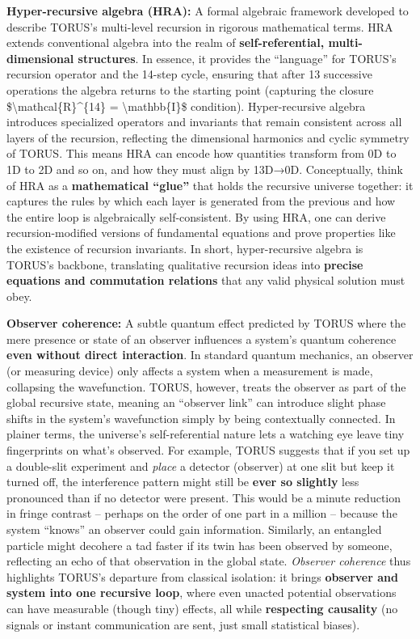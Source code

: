 \textbf{Hyper-recursive algebra (HRA):} A formal algebraic framework
developed to describe TORUS's multi-level recursion in rigorous
mathematical terms. HRA extends conventional algebra into the realm of
\textbf{self-referential, multi-dimensional structures}​. In essence, it
provides the ``language'' for TORUS's recursion operator and the 14-step
cycle, ensuring that after 13 successive operations the algebra returns
to the starting point (capturing the closure
\$\textbackslash{}mathcal\{R\}\^{}\{14\} = \textbackslash{}mathbb\{I\}\$
condition)​. Hyper-recursive algebra introduces specialized operators
and invariants that remain consistent across all layers of the
recursion, reflecting the dimensional harmonics and cyclic symmetry of
TORUS​. This means HRA can encode how quantities transform from 0D to 1D
to 2D and so on, and how they must align by 13D→0D. Conceptually, think
of HRA as a \textbf{mathematical ``glue''} that holds the recursive
universe together: it captures the rules by which each layer is
generated from the previous and how the entire loop is algebraically
self-consistent. By using HRA, one can derive recursion-modified
versions of fundamental equations and prove properties like the
existence of recursion invariants. In short, hyper-recursive algebra is
TORUS's backbone, translating qualitative recursion ideas into
\textbf{precise equations and commutation relations} that any valid
physical solution must obey.

\textbf{Observer coherence:} A subtle quantum effect predicted by TORUS
where the mere presence or state of an observer influences a system's
quantum coherence \textbf{even without direct interaction}​. In standard
quantum mechanics, an observer (or measuring device) only affects a
system when a measurement is made, collapsing the wavefunction. TORUS,
however, treats the observer as part of the global recursive state,
meaning an ``observer link'' can introduce slight phase shifts in the
system's wavefunction simply by being contextually connected​. In
plainer terms, the universe's self-referential nature lets a watching
eye leave tiny fingerprints on what's observed. For example, TORUS
suggests that if you set up a double-slit experiment and \emph{place} a
detector (observer) at one slit but keep it turned off, the interference
pattern might still be \textbf{ever so slightly} less pronounced than if
no detector were present​. This would be a minute reduction in fringe
contrast -- perhaps on the order of one part in a million -- because the
system ``knows'' an observer could gain information​. Similarly, an
entangled particle might decohere a tad faster if its twin has been
observed by someone, reflecting an echo of that observation in the
global state. \emph{Observer coherence} thus highlights TORUS's
departure from classical isolation: it brings \textbf{observer and
system into one recursive loop}, where even unacted potential
observations can have measurable (though tiny) effects, all while
\textbf{respecting causality} (no signals or instant communication are
sent, just small statistical biases).

